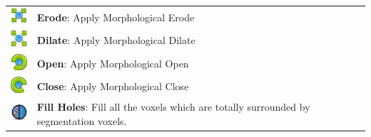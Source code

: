 \begin{tabular}{m{0.8cm} m{13cm}}
\includegraphics[width=0.7cm]{../../frontend/rsc/erode} &
\textbf{Erode}: Apply Morphological Erode\\
\includegraphics[width=0.7cm]{../../frontend/rsc/dilate} &
\textbf{Dilate}: Apply Morphological Dilate\\
\includegraphics[width=0.7cm]{../../frontend/rsc/open} &
\textbf{Open}: Apply Morphological Open\\
\includegraphics[width=0.7cm]{../../frontend/rsc/close} &
\textbf{Close}: Apply Morphological Close\\
\includegraphics[width=0.7cm]{../../frontend/rsc/fillHoles} &
\textbf{Fill Holes}: Fill all the voxels which are totally surrounded by
segmentation voxels.
\end{tabular}
